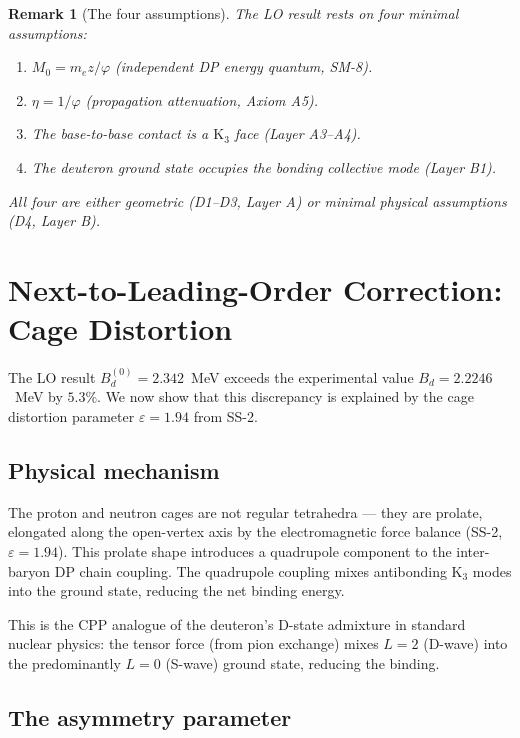 \documentclass[11pt,letterpaper]{article}
\newtheorem{remark}[theorem]{Remark}
\newcommand{\phig}{\varphi}
\newcommand{\Kthree}{\mathrm{K}_3}
\newcommand{\Mzero}{M_0}
\newcommand{\Bd}{B_d}
\newcommand{\Bdlo}{B_d^{(0)}}
\newcommand{\epscage}{\varepsilon}
\begin{document}
\begin{remark}[The four assumptions]
\label{rem:D1D4}
The LO result rests on four minimal assumptions:
\begin{enumerate}[label=D\arabic*:]
\item $\Mzero = m_e z/\phig$ (independent DP energy quantum,
SM-8).
\item $\eta = 1/\phig$ (propagation attenuation, Axiom A5).
\item The base-to-base contact is a $\Kthree$ face (Layer A3--A4).
\item The deuteron ground state occupies the bonding
collective mode (Layer B1).
\end{enumerate}
All four are either geometric (D1--D3, Layer A) or minimal
physical assumptions (D4, Layer B).
\end{remark}

\section{Next-to-Leading-Order Correction: Cage Distortion}
\label{sec:NLO}

The LO result $\Bdlo = 2.342$~MeV exceeds the experimental
value $\Bd = 2.2246$~MeV by $5.3\%$.  We now show that this
discrepancy is explained by the cage distortion parameter
$\epscage = 1.94$ from SS-2.

\subsection{Physical mechanism}

The proton and neutron cages are not regular tetrahedra ---
they are prolate, elongated along the open-vertex axis by
the electromagnetic force balance (SS-2, $\epscage = 1.94$).
This prolate shape introduces a quadrupole component to the
inter-baryon DP chain coupling.  The quadrupole coupling
mixes antibonding $\Kthree$ modes into the ground state,
reducing the net binding energy.

This is the CPP analogue of the deuteron's D-state admixture
in standard nuclear physics: the tensor force (from pion
exchange) mixes $L = 2$ (D-wave) into the predominantly
$L = 0$ (S-wave) ground state, reducing the binding.

\subsection{The asymmetry parameter}
\end{document}
